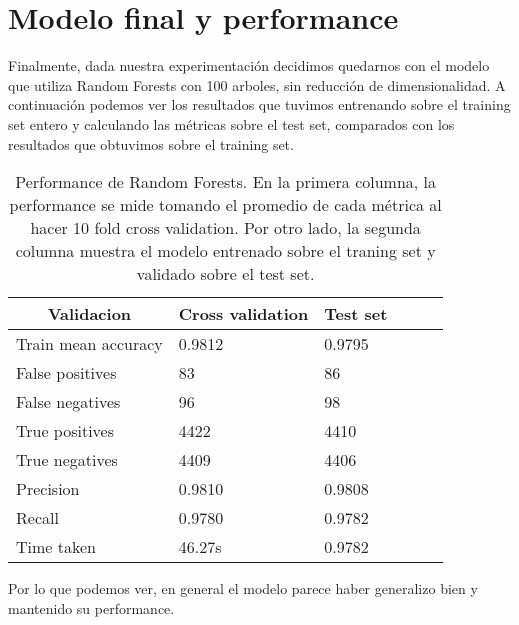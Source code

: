 \documentclass[10pt,a4paper]{article}
\begin{document}
\section{Modelo final y performance}

Finalmente, dada nuestra experimentación decidimos quedarnos con el modelo que utiliza Random Forests con 100 arboles, sin reducción de dimensionalidad. A continuación podemos ver los resultados que tuvimos entrenando sobre el training set entero y calculando las métricas sobre el test set, comparados con los resultados que obtuvimos sobre el training set.

\begin{table}[H]
	\centering
	\begin{tabular}{|l|l|l|l|l|l|}
		\hline
		\multicolumn{1}{|c|}{\textbf{Validacion}} & \multicolumn{1}{c|}{\textbf{Cross validation}} & \multicolumn{1}{c|}{\textbf{Test set}} \\
\hline
Train mean accuracy & 0.9812 & 0.9795\\ \hline
False positives     & 83 & 86 \\ \hline
False negatives     & 96 & 98\\ \hline
True positives      & 4422 & 4410\\ \hline
True negatives      & 4409 & 4406       \\ \hline
Precision           & 0.9810 & 0.9808 \\ \hline
Recall              & 0.9780 & 0.9782 \\ \hline
Time taken          & 46.27s & 0.9782 \\ \hline
	\end{tabular}
	\caption{Performance de Random Forests. En la primera columna, la performance se mide tomando el promedio de cada métrica al hacer 10 fold cross validation. Por otro lado, la segunda columna muestra el modelo entrenado sobre el traning set y validado sobre el test set.}
	\label{rfperf}
\end{table}

Por lo que podemos ver, en general el modelo parece haber generalizo bien y mantenido su performance.

\end{document}
